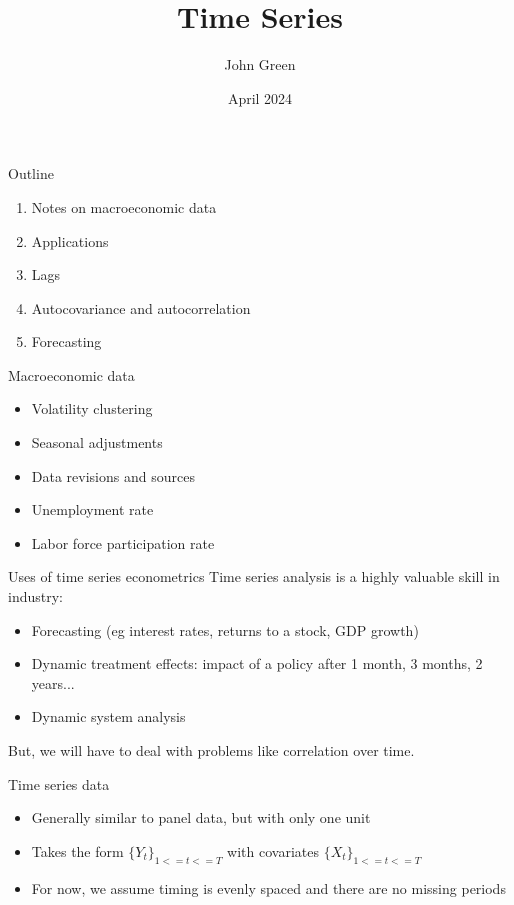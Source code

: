\documentclass[aspectratio=169]{beamer}
\title{Time Series}
\author{John Green}
\date{April 2024}
\begin{document}
\begin{frame}
    \titlepage 
\end{frame}

\begin{frame}{Outline}
    \begin{enumerate}
       \item Notes on macroeconomic data
       \item Applications
       \item Lags
       \item Autocovariance and autocorrelation
       \item Forecasting
    \end{enumerate}
\end{frame}

\begin{frame}{Macroeconomic data}
    \begin{itemize}
       \item Volatility clustering
       \item Seasonal adjustments
       \item Data revisions and sources
       \item Unemployment rate 
       \item Labor force participation rate 
    \end{itemize}
\end{frame}

\begin{frame}{Uses of time series econometrics}
    Time series analysis is a highly valuable skill in industry:
    \begin{itemize}
       \item Forecasting (eg interest rates, returns to a stock, GDP growth)
       \item Dynamic treatment effects: impact of a policy after 1 month, 3 months, 2 years...
       \item Dynamic system analysis
    \end{itemize}
    But, we will have to deal with problems like correlation over time.
\end{frame}

\begin{frame}{Time series data}
    \begin{itemize}
       \item Generally similar to panel data, but with only one unit
       \item Takes the form $\{Y_t\}_{1 <= t <= T}$ with covariates $\{X_t\}_{1 <= t <= T}$
       \item For now, we assume timing is evenly spaced and there are no missing periods
    \end{itemize}
\end{frame}
\end{document}
